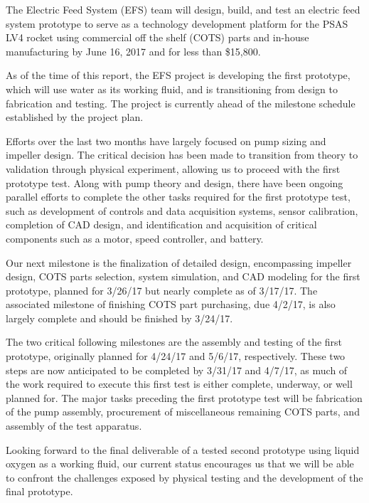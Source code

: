 \documentclass[11pt,twoside,a4paper,openright]{report}
\begin{document}
\vspace{12pt}
The Electric Feed System (EFS) team will design, build, and test an electric feed system prototype to serve as a technology development platform for the PSAS LV4 rocket using commercial off the shelf (COTS) parts and in-house manufacturing by June 16, 2017 and for less than \$15,800.\par
\vspace{12pt}
As of the time of this report, the EFS project is developing the first prototype, which will use water as its working fluid, and is transitioning from design to fabrication and testing. The project is currently ahead of the milestone schedule established by the project plan. \par
\vspace{12pt}
Efforts over the last two months have largely focused on pump sizing and impeller design. The critical decision has been made to transition from theory to validation through physical experiment, allowing us to proceed with the first prototype test. Along with pump theory and design, there have been ongoing parallel efforts to complete the other tasks required for the first prototype test, such as development of controls and data acquisition systems, sensor calibration, completion of CAD design, and identification and acquisition of critical components such as a motor, speed controller, and battery.\par
\vspace{12pt}
Our next milestone is the finalization of detailed design, encompassing impeller design, COTS parts selection, system simulation, and CAD modeling for the first prototype, planned for 3/26/17 but nearly complete as of 3/17/17. The associated milestone of finishing COTS part purchasing, due 4/2/17, is also largely complete and should be finished by 3/24/17.\par
\vspace{12pt}
The two critical following milestones are the assembly and testing of the first prototype, originally planned for 4/24/17 and 5/6/17, respectively. These two steps are now anticipated to be completed by 3/31/17 and 4/7/17, as much of the work required to execute this first test is either complete, underway, or well planned for. The major tasks preceding the first prototype test will be fabrication of the pump assembly, procurement of miscellaneous remaining COTS parts, and assembly of the test apparatus.\par
\vspace{12pt}
Looking forward to the final deliverable of a tested second prototype using liquid oxygen as a working fluid, our current status encourages us that we will be able to confront the challenges exposed by physical testing and the development of the final prototype.\par
\vspace{4cm}
\end{document}
